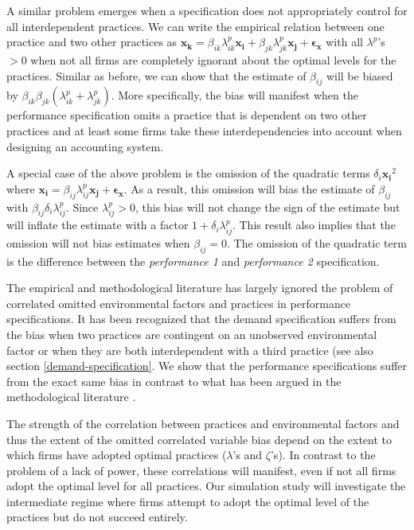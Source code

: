 \documentclass[12pt]{article}
\begin{document}
A similar problem emerges when a specification does not appropriately control for all interdependent practices. We can write the empirical relation between one practice and two other practices as $\mathbf{x_k} = \beta_{ik} \lambda^p_{ik} \mathbf{x_i} + \beta_{jk} \lambda^p_{jk} \mathbf{x_j} + \mathbf{\epsilon_x}$ with all $\lambda^p$'s $>0$ when not all firms are completely ignorant about the optimal levels for the practices. Similar as before, we can show that the estimate of $\beta_{ij}$ will be biased by $\beta_{ik} \beta_{jk} (\lambda^p_{ik} + \lambda^p_{jk})$. More specifically, the bias will manifest when the performance specification omits a practice that is dependent on two other practices and at least some firms take these interdependencies into account when designing an accounting system.

A special case of the above problem is the omission of the quadratic terms $\delta_i \mathbf{x_i}^2$ where $\mathbf{x_i} =  \beta_{ij} \lambda^p_{ij} \mathbf{x_j} + \mathbf{\epsilon_x}$. As a result, this omission will bias the estimate of $\beta_{ij}$ with $\beta_{ij} 
\delta_i \lambda^p_{ij}$. Since $\lambda^p_{ij} > 0$, this bias will not change the sign of the estimate but will inflate the estimate with a factor $1 + \delta_i \lambda^p_{ij}$.  This result also implies that the omission will not bias estimates when $\beta_{ij} = 0$. The omission of the quadratic term is the difference between the \emph{performance 1} and \emph{performance 2} specification.

The empirical and methodological literature has largely ignored the problem of correlated omitted environmental factors and practices in performance specifications. It has been recognized that the demand specification suffers from the bias when two practices are contingent on an unobserved environmental factor or when they are both interdependent with a third practice (see also section \ref{demand-specification}. We show that the performance specifications suffer from the exact same bias in contrast to what has been argued in the methodological literature \citep{Carree2011}. 

The strength of the correlation between practices and environmental factors and thus the extent of the omitted correlated variable bias depend on the extent to which firms have adopted optimal practices ($\lambda$'s and $\zeta$'s). In contrast to the problem of a lack of power, these correlations will manifest, even if not all firms adopt the optimal level for all practices. Our simulation study will investigate the intermediate regime where firms attempt to adopt the optimal level of the practices but do not succeed entirely.
\end{document}
